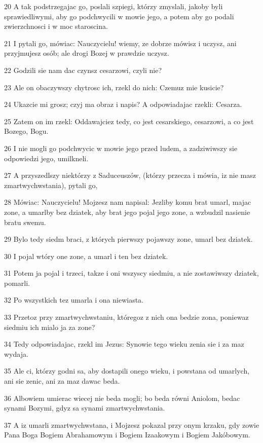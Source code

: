 \par 20 A tak podstrzegajac go, poslali szpiegi, którzy zmyslali, jakoby byli sprawiedliwymi, aby go podchwycili w mowie jego, a potem aby go podali zwierzchnosci i w moc staroscina.
\par 21 I pytali go, mówiac: Nauczycielu! wiemy, ze dobrze mówisz i uczysz, ani przyjmujesz osób; ale drogi Bozej w prawdzie uczysz.
\par 22 Godzili sie nam dac czynsz cesarzowi, czyli nie?
\par 23 Ale on obaczywszy chytrosc ich, rzekl do nich: Czemuz mie kusicie?
\par 24 Ukazcie mi grosz; czyj ma obraz i napis? A odpowiadajac rzekli: Cesarza.
\par 25 Zatem on im rzekl: Oddawajciez tedy, co jest cesarskiego, cesarzowi, a co jest Bozego, Bogu.
\par 26 I nie mogli go podchwycic w mowie jego przed ludem, a zadziwiwszy sie odpowiedzi jego, umilkneli.
\par 27 A przyszedlszy niektórzy z Saduceuszów, (którzy przecza i mówia, iz nie masz zmartwychwstania), pytali go,
\par 28 Mówiac: Nauczycielu! Mojzesz nam napisal: Jezliby komu brat umarl, majac zone, a umarlby bez dziatek, aby brat jego pojal jego zone, a wzbudzil nasienie bratu swemu.
\par 29 Bylo tedy siedm braci, z których pierwszy pojawszy zone, umarl bez dziatek.
\par 30 I pojal wtóry one zone, a umarl i ten bez dziatek.
\par 31 Potem ja pojal i trzeci, takze i oni wszyscy siedmiu, a nie zostawiwszy dziatek, pomarli.
\par 32 Po wszystkich tez umarla i ona niewiasta.
\par 33 Przetoz przy zmartwychwstaniu, któregoz z nich ona bedzie zona, poniewaz siedmiu ich mialo ja za zone?
\par 34 Tedy odpowiadajac, rzekl im Jezus: Synowie tego wieku zenia sie i za maz wydaja.
\par 35 Ale ci, którzy godni sa, aby dostapili onego wieku, i powstana od umarlych, ani sie zenic, ani za maz dawac beda.
\par 36 Albowiem umierac wiecej nie beda mogli; bo beda równi Aniolom, bedac synami Bozymi, gdyz sa synami zmartwychwstania.
\par 37 A iz umarli zmartwychwstana, i Mojzesz pokazal przy onym krzaku, gdy zowie Pana Boga Bogiem Abrahamowym i Bogiem Izaakowym i Bogiem Jakóbowym.
